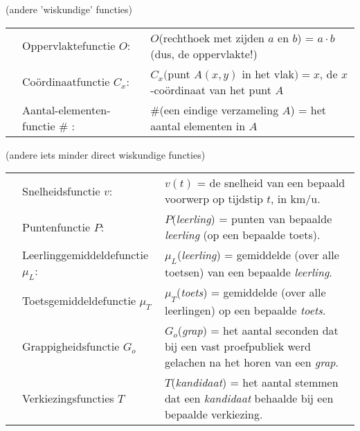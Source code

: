 \documentclass{ximera}
\begin{document}
\begin{example} (andere 'wiskundige' functies)

\begin{tabular}[t]{l l l}
    & Oppervlaktefunctie $O$:    & $O$(rechthoek met zijden $a$ en $b$) = $a\cdot b$ (dus, de oppervlakte!) \\
    & Coördinaatfunctie $C_x$\footnotemark[3]:     & $C_x($punt $A(x,y) $ in het vlak$) = x$, de $x$-coördinaat van het punt $A$  \\
    & Aantal-elementen-functie \# \footnotemark[4]: & \#(een eindige verzameling $A$) = het aantal elementen in $A$
\end{tabular}

\end{example}

\begin{example} (andere iets minder direct wiskundige functies)
    
\begin{tabular}{l l p{8cm}}
    & Snelheidsfunctie $v$:     & $v(t)$ = de snelheid van een bepaald voorwerp op tijdstip $t$, in km/u.  \\    
    & Puntenfunctie $P$:        & $P$(\textit{leerling}) = punten van bepaalde \textit{leerling} (op een bepaalde toets).  \\
    & Leerlinggemiddeldefunctie $\mu_L$: & $\mu_L$(\textit{leerling}) = gemiddelde (over alle toetsen) van een bepaalde \textit{leerling}.  \\
    & Toetsgemiddeldefunctie $\mu_T$ & $\mu_T$(\textit{toets}) = gemiddelde (over alle leerlingen) op een bepaalde \textit{toets}. \\
    & Grappigheidsfunctie $G_o$  & $G_o$(\textit{grap}) = het aantal seconden dat bij een vast proefpubliek  werd gelachen na het horen van een \textit{grap}. \\
    & Verkiezingsfuncties $T$   & $T$(\textit{kandidaat}) =  het aantal stemmen dat een \textit{kandidaat} behaalde bij een bepaalde verkiezing. \\
\end{tabular}
\end{example}
\end{document}
